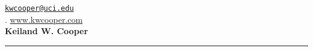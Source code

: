 \documentclass[10pt]{article}
\renewcommand\emph[1]{#1}
\newcommand{\makeheading}[2][]%
        {\hspace*{-\marginparsep minus \marginparwidth}%
         \begin{minipage}[t]{\textwidth+\marginparwidth+\marginparsep}%
             {\large \bfseries #2 \hfill #1}\\[-0.15\baselineskip]%
                 \rule{\columnwidth}{1pt}%
         \end{minipage}}
\renewcommand{\section}[1]{\pagebreak[3]%
    \vspace{1.3\baselineskip}%
    \phantomsection\addcontentsline{toc}{section}{#1}%
    \noindent\llap{\scshape\smash{\parbox[t]{\marginparwidth}{\hyphenpenalty=10000\raggedright #1}}}%
    \vspace{-\baselineskip}\par}
\providecommand*\emaillink[1]{\nolinkurl{#1}}
\providecommand*\email[1]{\href{mailto:#1}{\emaillink{#1}}}
\begin{document}
\thispagestyle{plain}

\hspace*{-\marginparsep minus \marginparwidth}%
 \begin{minipage}[t]{\textwidth+\marginparwidth+\marginparsep}%

\hfill \emph{\faEnvelope} \email{kwcooper@uci.edu}\\
. \hfill \emph{\faHome} \href{http://www.kwcooper.com/}{www.kwcooper.com}\\ 
\textbf{\large{Keiland W. Cooper}} \hfill \\ 
[-0.15\baselineskip]%
\rule{\columnwidth}{1pt}%
\end{minipage}




%
%

%
%
%
%
\end{document}
